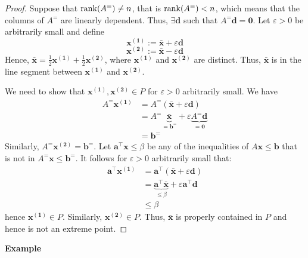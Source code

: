 \begin{proof}
    Suppose that $ \operatorname{rank}(A^=)\neq n $, that is $ \operatorname{rank}(A^=)<n $, which
    means that the columns of $ A^= $ are linearly dependent. Thus,
    $ \exists \bm{d} $ such that $ A^=\bm{d}=\bm{0} $. Let
    $ \varepsilon > 0 $ be arbitrarily small and define
    \[ \bm{x^{(1)}} := \bm{\bar{x}} + \varepsilon \bm{d} \]
    \[ \bm{x^{(2)}} := \bm{\bar{x}} - \varepsilon \bm{d} \]
    Hence, $ \bm{\bar{x}}=\frac{1}{2}\bm{x^{(1)}}+\frac{1}{2} \bm{x^{(2)}} $, where
    $ \bm{x^{(1)}} $ and $ \bm{x^{(2)}} $ are distinct. Thus,
    $ \bm{\bar{x}} $ is in the line segment between $ \bm{x^{(1)}} $ and
    $ \bm{x^{(2)}} $.

    We need to show that $ \bm{x^{(1)}},\bm{x^{(2)}}\in P $
    for  $ \varepsilon > 0 $ arbitrarily small. We have
    \begin{align*}
        A^= \bm{x^{(1)}} & =A^=(\bm{\bar{x}} + \varepsilon \bm{d})    \\
                         & =A^= \underbrace{\bm{\bar{x}}}_{=\bm{b^=}}
        +\varepsilon\underbrace{A^= \bm{d}}_{=\bm{0}}                 \\
                         & =\bm{b^=}
    \end{align*}
    Similarly, $ A^= \bm{x^{(2)}}= \bm{b^=}$. Let $ \bm{a}^\top \bm{x}\leqslant \beta $
    be any of the inequalities of $ A \bm{x}\leqslant \bm{b} $ that is not in
    $ A^= \bm{x}\leqslant \bm{b}^= $.
    It follows for $ \varepsilon >0 $ arbitrarily small that:
    \begin{align*}
        \bm{a}^\top \bm{x^{(1)}} & = \bm{a}^\top(\bm{\bar{x}} + \varepsilon \bm{d})          \\
                                 & =\underbrace{\bm{a}^\top \bm{\bar{x}}}_{\leqslant \beta}+
        \varepsilon \bm{a}^\top \bm{d}                                                       \\
                                 & \leqslant \beta
    \end{align*}
    hence $ \bm{x^{(1)}}\in P $. Similarly, $ \bm{x^{(2)}}\in P $. Thus,
    $ \bm{\bar{x}} $ is properly contained in $ P $ and hence is not
    an extreme point.
\end{proof}

\textbf{Example}

